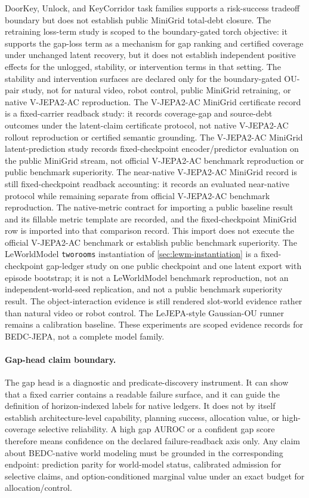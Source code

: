 DoorKey, Unlock, and KeyCorridor task families supports a risk-success
tradeoff boundary but does not establish public MiniGrid total-debt closure.
The retraining loss-term study is scoped to the
boundary-gated torch objective: it supports the gap-loss term as a mechanism
for gap ranking and certified coverage under unchanged latent recovery, but it
does not establish independent positive effects for the unlogged, stability,
or intervention terms in that setting.  The stability and intervention
surfaces are declared only for the boundary-gated OU-pair study, not for
natural video, robot control, public MiniGrid retraining, or native
V-JEPA2-AC reproduction.  The V-JEPA2-AC MiniGrid certificate record
is a fixed-carrier readback study: it records coverage-gap and source-debt
outcomes under the latent-claim certificate protocol, not native V-JEPA2-AC
rollout reproduction or certified semantic grounding.  The V-JEPA2-AC MiniGrid
latent-prediction study records fixed-checkpoint encoder/predictor evaluation
on the public MiniGrid stream, not official V-JEPA2-AC benchmark reproduction
or public benchmark superiority.  The near-native V-JEPA2-AC MiniGrid record
is still fixed-checkpoint readback accounting: it records an evaluated
near-native protocol while remaining separate from official V-JEPA2-AC
benchmark reproduction.  The native-metric contract for importing a public baseline result
and its fillable metric template are recorded, and the fixed-checkpoint
MiniGrid row is imported into that comparison record.  This import does not
execute the official V-JEPA2-AC benchmark or establish public benchmark superiority.  The
LeWorldModel \texttt{tworooms} instantiation of
\autoref{sec:lewm-instantiation} is a fixed-checkpoint gap-ledger study on
one public checkpoint and one latent export with episode bootstrap; it is not
a LeWorldModel benchmark reproduction, not an independent-world-seed
replication, and not a public benchmark superiority result.  The
object-interaction
evidence is still
rendered slot-world evidence rather than natural video or robot control.  The
LeJEPA-style
Gaussian-OU runner remains a calibration baseline.  These experiments are
scoped evidence records for BEDC-JEPA, not a complete model family.

\paragraph{Gap-head claim boundary.}
The gap head is a diagnostic and predicate-discovery instrument.  It can show
that a fixed carrier contains a readable failure surface, and it can guide the
definition of horizon-indexed labels for native ledgers.  It does not by itself
establish architecture-level capability, planning success, allocation value, or
high-coverage selective reliability.  A high gap AUROC or a confident gap score
therefore means confidence on the declared failure-readback axis only.  Any
claim about BEDC-native world modeling must be grounded in the corresponding
endpoint: prediction parity for world-model status, calibrated admission for
selective claims, and option-conditioned marginal value under an exact budget
for allocation/control.

